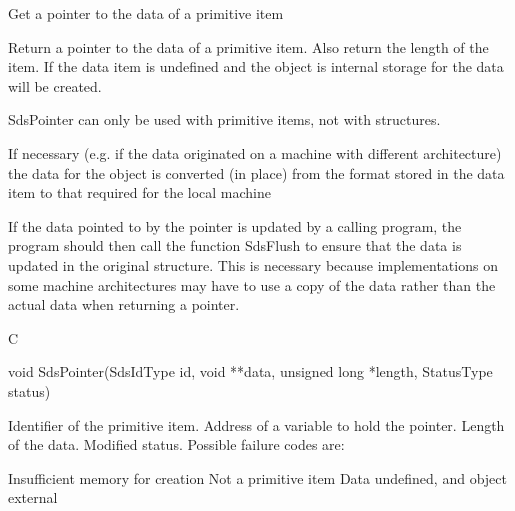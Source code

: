\begin{manroutinedescription}
      Get a pointer to the data of a primitive item

      Return a pointer to the data of a primitive item. Also return the length
      of the item. If the data item is undefined and the object is internal
      storage for the data will be created.

      SdsPointer can only be used with primitive items, not with structures.

      If necessary (e.g. if the data originated on a machine with different
      architecture) the data for the object is converted (in place) from the
      format stored in the data item to that required for the local machine

      If the data pointed to by the pointer is updated by a calling program,
      the program should then call the function SdsFlush to ensure that the
      data is updated in the original structure. This is necessary because
      implementations on some machine architectures may have to use a copy
      of the data rather than the actual data when returning a pointer.
 
      C

      void SdsPointer(SdsIdType id, void **data, unsigned long *length,
              StatusType {\mantt{*}} {} status)
 
\begin{manparametertable}
  Identifier of the primitive %
item.
 Address of a variable to hold %
the pointer.
 Length of the data.
 Modified status. Possible %
failure codes are:
\end{manparametertable}
\begin{mantwocolumntable}
Insufficient memory for creation
Not a primitive item
Data undefined, and object %
external
\end{mantwocolumntable}
\end{manroutinedescription}
